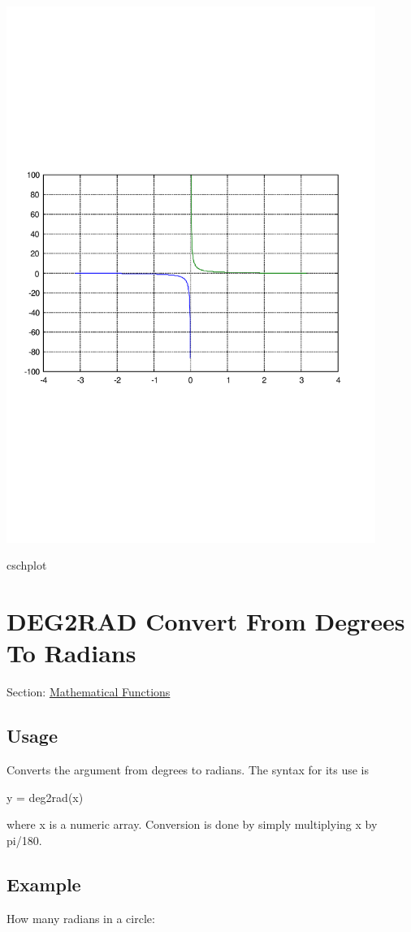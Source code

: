  
\begin{DoxyImage}
\includegraphics[width=12cm]{cschplot}
\caption{cschplot}
\end{DoxyImage}
 \hypertarget{mathfunctions_deg2rad}{}\section{D\-E\-G2\-R\-A\-D Convert From Degrees To Radians}\label{mathfunctions_deg2rad}
Section\-: \hyperlink{sec_mathfunctions}{Mathematical Functions} \hypertarget{vtkwidgets_vtkxyplotwidget_Usage}{}\subsection{Usage}\label{vtkwidgets_vtkxyplotwidget_Usage}
Converts the argument from degrees to radians. The syntax for its use is \begin{DoxyVerb}   y = deg2rad(x)
\end{DoxyVerb}
 where {\ttfamily x} is a numeric array. Conversion is done by simply multiplying {\ttfamily x} by {\ttfamily pi/180}. \hypertarget{variables_struct_Example}{}\subsection{Example}\label{variables_struct_Example}
How many radians in a circle\-:


